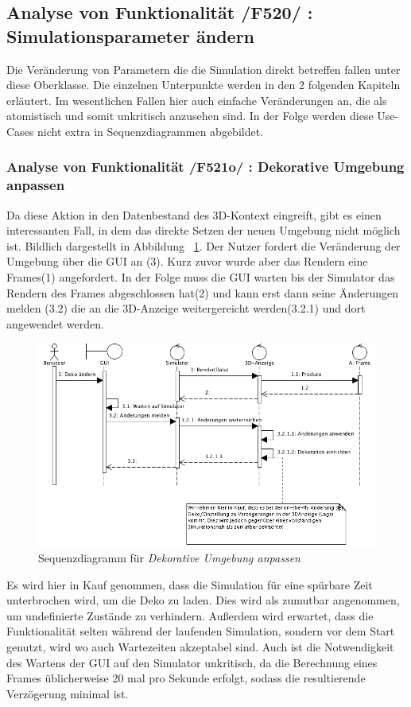 \subsection{Analyse von Funktionalität /F520/ :  Simulationsparameter ändern}
Die Veränderung von Parametern die die Simulation direkt betreffen fallen unter diese Oberklasse. Die einzelnen Unterpunkte werden in den 2 folgenden Kapiteln erläutert. Im wesentlichen Fallen hier 
auch einfache Veränderungen an, die als atomistisch und somit unkritisch anzusehen sind. In der Folge werden diese Use-Cases nicht extra in Sequenzdiagrammen abgebildet.
\subsubsection{Analyse von Funktionalität /F521o/ :  Dekorative Umgebung anpassen}
Da diese Aktion in den Datenbestand des 3D-Kontext eingreift, gibt es einen interessanten Fall, in dem das direkte Setzen der neuen Umgebung nicht möglich ist. Bildlich dargestellt in Abbildung ~\ref{fig:change_graphic_deko}.
Der Nutzer fordert die Veränderung der Umgebung über die GUI an (3). Kurz zuvor wurde aber das Rendern eine Frames(1) angefordert. 
In der Folge muss die GUI warten bis der Simulator das Rendern des Frames abgeschlossen hat(2) und kann erst dann seine Änderungen melden (3.2) die an die 3D-Anzeige weitergereicht werden(3.2.1) und dort angewendet werden.

\begin{figure}[h!]
\includegraphics[width=\linewidth]{bilder/change_graphic_deko}
\caption{Sequenzdiagramm für \textit{Dekorative Umgebung anpassen}}
\label{fig:change_graphic_deko}
\end{figure}
Es wird hier in Kauf genommen, dass die Simulation für eine spürbare Zeit unterbrochen wird, um die Deko zu laden. Dies wird als zumutbar angenommen, um undefinierte Zustände zu verhindern. 
Außerdem wird erwartet, dass die Funktionalität selten während der laufenden Simulation, sondern vor dem Start genutzt, wird wo auch Wartezeiten akzeptabel sind.
Auch ist die Notwendigkeit des Wartens der GUI auf den Simulator unkritisch, da die Berechnung eines Frames üblicherweise 20 mal pro Sekunde erfolgt, sodass die resultierende Verzögerung minimal ist.

